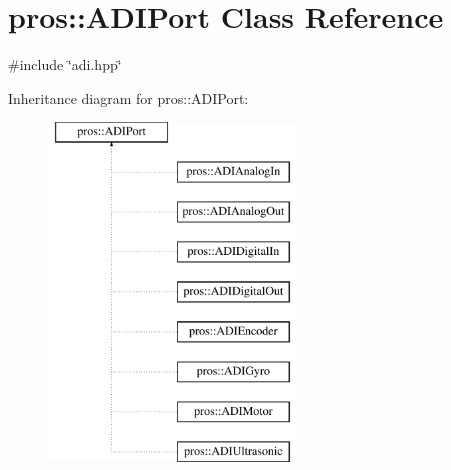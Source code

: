\hypertarget{classpros_1_1ADIPort}{}\section{pros\+:\+:A\+D\+I\+Port Class Reference}
\label{classpros_1_1ADIPort}


{\ttfamily \#include \char`\"{}adi.\+hpp\char`\"{}}

Inheritance diagram for pros\+:\+:A\+D\+I\+Port\+:\begin{figure}[H]
\begin{center}
\leavevmode
\includegraphics[height=9.000000cm]{classpros_1_1ADIPort}
\end{center}
\end{figure}
